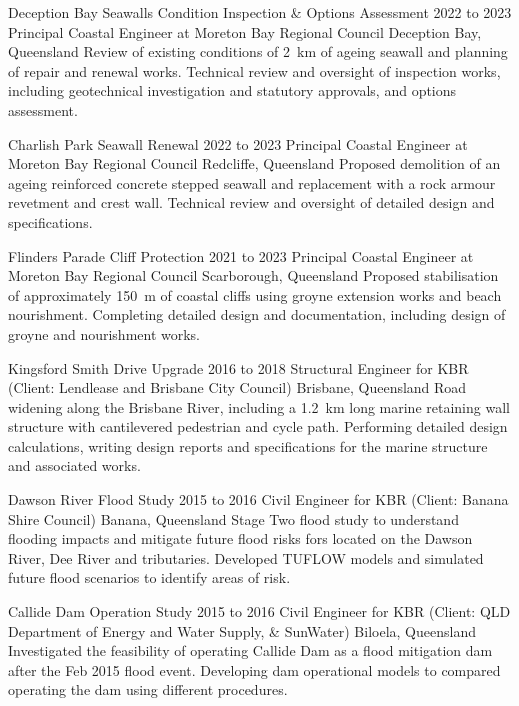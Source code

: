 	\entrytableproject%
	{Deception Bay Seawalls Condition Inspection \& Options Assessment}
	{2022 to 2023}
	{}
	{Principal Coastal Engineer at Moreton Bay Regional Council}
	{Deception Bay, Queensland}
	{Review of existing conditions of \SI{2}{\km} of ageing seawall and planning of repair and renewal works.}
	{Technical review and oversight of inspection works, including geotechnical investigation and statutory approvals, and options assessment.}

	\entrytableproject%
	{Charlish Park Seawall Renewal}
	{2022 to 2023}
	{}
	{Principal Coastal Engineer at Moreton Bay Regional Council}
	{Redcliffe, Queensland}
	{Proposed demolition of an ageing reinforced concrete stepped seawall and replacement with a rock armour revetment and crest wall.}
	{Technical review and oversight of detailed design and specifications.}

	\entrytableproject%
	{Flinders Parade Cliff Protection}
	{2021 to 2023}
	{}
	{Principal Coastal Engineer at Moreton Bay Regional Council}
	{Scarborough, Queensland}
	{Proposed stabilisation of approximately \SI{150}{\m} of coastal cliffs using groyne extension works and beach nourishment.}
	{Completing detailed design and documentation, including design of groyne and nourishment works.}

	\entrytableproject%
	{Kingsford Smith Drive Upgrade}
	{2016 to 2018}
	{}
	{Structural Engineer for KBR (Client: Lendlease and Brisbane City Council)}
	{Brisbane, Queensland}
	{Road widening along the Brisbane River, including a \SI{1.2}{\km} long marine retaining wall structure with cantilevered pedestrian and cycle path.}
	{Performing detailed design calculations, writing design reports and specifications for the marine structure and associated works.}

	\entrytableproject%
	{Dawson River Flood Study}
	{2015 to 2016}
	{}
	{Civil Engineer for KBR (Client: Banana Shire Council)}
	{Banana, Queensland}
	{Stage Two flood study to understand flooding impacts and mitigate future flood risks fors located on the Dawson River, Dee River and tributaries.}
	{Developed TUFLOW models and simulated future flood scenarios to identify areas of risk.}

	\entrytableproject%
	{Callide Dam Operation Study}
	{2015 to 2016}
	{}
	{Civil Engineer for KBR (Client: QLD Department of Energy and Water Supply, \& SunWater)}
	{Biloela, Queensland}
	{Investigated the feasibility of operating Callide Dam as a flood mitigation dam after the Feb 2015 flood event.}
	{Developing dam operational models to compared operating the dam using different procedures.}

